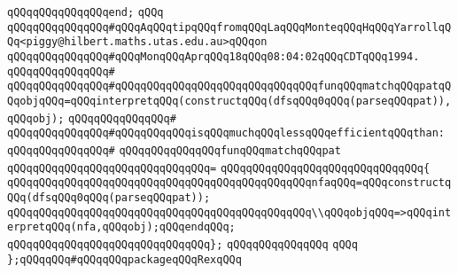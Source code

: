 \verb|qQQqqQQqqQQqqQQqend;|\newline
\verb|qQQq|\newline
\newline
\verb|qQQqqQQqqQQqqQQq#qQQqAqQQqtipqQQqfromqQQqLaqQQqMonteqQQqHqQQqYarrollqQQq<piggy@hilbert.maths.utas.edu.au>qQQqon|\newline
\verb|qQQqqQQqqQQqqQQq#qQQqMonqQQqAprqQQq18qQQq08:04:02qQQqCDTqQQq1994.|\newline
\verb|qQQqqQQqqQQqqQQq#|\newline
\verb|qQQqqQQqqQQqqQQq#qQQqqQQqqQQqqQQqqQQqqQQqqQQqqQQqfunqQQqmatchqQQqpatqQQqobjqQQq=qQQqinterpretqQQq(constructqQQq(dfsqQQq0qQQq(parseqQQqpat)),qQQqobj);|\newline
\verb|qQQqqQQqqQQqqQQq#|\newline
\verb|qQQqqQQqqQQqqQQq#qQQqqQQqqQQqisqQQqmuchqQQqlessqQQqefficientqQQqthan:|\newline
\verb|qQQqqQQqqQQqqQQq#|\newline
\verb|qQQqqQQqqQQqqQQqfunqQQqmatchqQQqpat|\newline
\verb|qQQqqQQqqQQqqQQqqQQqqQQqqQQqqQQq=|\newline
\verb|qQQqqQQqqQQqqQQqqQQqqQQqqQQqqQQq{|\newline
\verb|qQQqqQQqqQQqqQQqqQQqqQQqqQQqqQQqqQQqqQQqqQQqqQQqnfaqQQq=qQQqconstructqQQq(dfsqQQq0qQQq(parseqQQqpat));|\newline
\newline
\verb|qQQqqQQqqQQqqQQqqQQqqQQqqQQqqQQqqQQqqQQqqQQqqQQq\\qQQqobjqQQq=>qQQqinterpretqQQq(nfa,qQQqobj);qQQqendqQQq;|\newline
\verb|qQQqqQQqqQQqqQQqqQQqqQQqqQQqqQQq};|\newline
\newline
\verb|qQQqqQQqqQQqqQQq|\newline
\verb|qQQq|\newline
\verb|};qQQqqQQq#qQQqqQQqpackageqQQqRexqQQq|\newline
\newline
\newline
\newline
\newline
\newline
\newline

